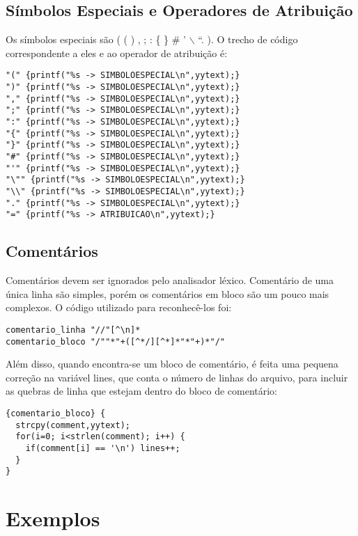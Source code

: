 \documentclass[a4paper,10pt]{article}
\begin{document}
  \subsection{Símbolos Especiais e Operadores de Atribuição}
  Os símbolos especiais são ( ( ) , ; : \{ \} \# ' $\backslash$ \textquotedblleft . ). O trecho de código correspondente a eles e ao operador de atribuição é:
  \begin{verbatim}
"(" {printf("%s -> SIMBOLOESPECIAL\n",yytext);}
")" {printf("%s -> SIMBOLOESPECIAL\n",yytext);}
"," {printf("%s -> SIMBOLOESPECIAL\n",yytext);}
";" {printf("%s -> SIMBOLOESPECIAL\n",yytext);}
":" {printf("%s -> SIMBOLOESPECIAL\n",yytext);}
"{" {printf("%s -> SIMBOLOESPECIAL\n",yytext);}
"}" {printf("%s -> SIMBOLOESPECIAL\n",yytext);}
"#" {printf("%s -> SIMBOLOESPECIAL\n",yytext);}
"'" {printf("%s -> SIMBOLOESPECIAL\n",yytext);}
"\"" {printf("%s -> SIMBOLOESPECIAL\n",yytext);}
"\\" {printf("%s -> SIMBOLOESPECIAL\n",yytext);}
"." {printf("%s -> SIMBOLOESPECIAL\n",yytext);}
"=" {printf("%s -> ATRIBUICAO\n",yytext);}
  \end{verbatim}

\subsection{Comentários}
  Comentários devem ser ignorados pelo analisador léxico. Comentário de uma única linha são simples, porém os comentários em bloco
  são um pouco mais complexos. O código utilizado para reconhecê-los foi:
  \begin{verbatim}
comentario_linha "//"[^\n]*
comentario_bloco "/""*"+([^*/][^*]*"*"+)*"/"
\end{verbatim}
Além disso, quando encontra-se um bloco de comentário, é feita uma pequena correção na variável lines, que conta o número de linhas
do arquivo, para incluir as quebras de linha que estejam dentro do bloco de comentário:
\begin{verbatim}
{comentario_bloco} {
  strcpy(comment,yytext);	
  for(i=0; i<strlen(comment); i++) {
    if(comment[i] == '\n') lines++;
  }
}
\end{verbatim}

\section{Exemplos}
\end{document}
